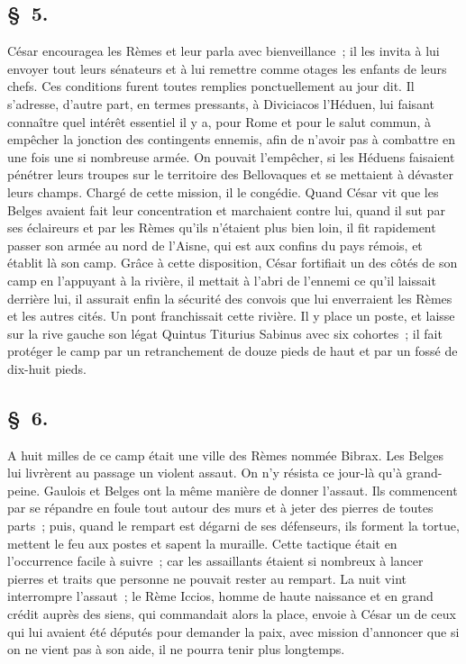 \documentclass[french,twoside]{book} %
\begin{document}
\subsection[{§ 5.}]{ \textsc{§ 5.} }
\noindent César encouragea les Rèmes et leur parla avec bienveillance ; il les invita à lui envoyer tout leurs sénateurs et à lui remettre comme otages les enfants de leurs chefs. Ces conditions furent toutes remplies ponctuellement au jour dit. Il s’adresse, d’autre part, en termes pressants, à Diviciacos l’Héduen, lui faisant connaître quel intérêt essentiel il y a, pour Rome et pour le salut commun, à empêcher la jonction des contingents ennemis, afin de n’avoir pas à combattre en une fois une si nombreuse armée. On pouvait l’empêcher, si les Héduens faisaient pénétrer leurs troupes sur le territoire des Bellovaques et se mettaient à dévaster leurs champs. Chargé de cette mission, il le congédie. Quand César vit que les Belges avaient fait leur concentration et marchaient contre lui, quand il sut par ses éclaireurs et par les Rèmes qu’ils n’étaient plus bien loin, il fit rapidement passer son armée au nord de l’Aisne, qui est aux confins du pays rémois, et établit là son camp. Grâce à cette disposition, César fortifiait un des côtés de son camp en l’appuyant à la rivière, il mettait à l’abri de l’ennemi ce qu’il laissait derrière lui, il assurait enfin la sécurité des convois que lui enverraient les Rèmes et les autres cités. Un pont franchissait cette rivière. Il y place un poste, et laisse sur la rive gauche son légat Quintus Titurius Sabinus avec six cohortes ; il fait protéger le camp par un retranchement de douze pieds de haut et par un fossé de dix-huit pieds.
\subsection[{§ 6.}]{ \textsc{§ 6.} }
\noindent A huit milles de ce camp était une ville des Rèmes nommée Bibrax. Les Belges lui livrèrent au passage un violent assaut. On n’y résista ce jour-là qu’à grand-peine. Gaulois et Belges ont la même manière de donner l’assaut. Ils commencent par se répandre en foule tout autour des murs et à jeter des pierres de toutes parts ; puis, quand le rempart est dégarni de ses défenseurs, ils forment la tortue, mettent le feu aux postes et sapent la muraille. Cette tactique était en l’occurrence facile à suivre ; car les assaillants étaient si nombreux à lancer pierres et traits que personne ne pouvait rester au rempart. La nuit vint interrompre l’assaut ; le Rème Iccios, homme de haute naissance et en grand crédit auprès des siens, qui commandait alors la place, envoie à César un de ceux qui lui avaient été députés pour demander la paix, avec mission d’annoncer que si on ne vient pas à son aide, il ne pourra tenir plus longtemps.
\end{document}
